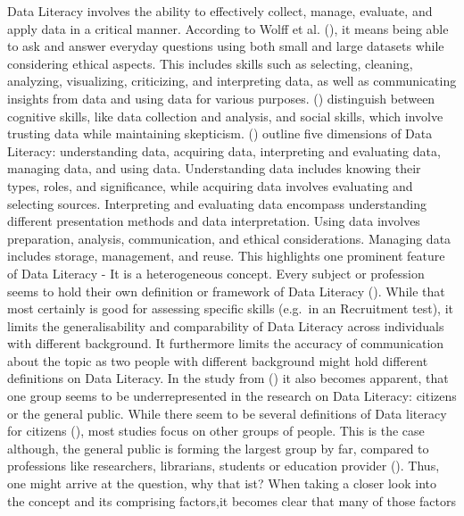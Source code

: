\documentclass[
  12pt,
  a4paper,
  twoside]{article}
\begin{document}
Data Literacy involves the ability to effectively collect, manage,
evaluate, and apply data in a critical manner. According to Wolff et al.
(), it means being able to ask and answer
everyday questions using both small and large datasets while considering
ethical aspects. This includes skills such as selecting, cleaning,
analyzing, visualizing, criticizing, and interpreting data, as well as
communicating insights from data and using data for various purposes.
() distinguish between cognitive
skills, like data collection and analysis, and social skills, which
involve trusting data while maintaining skepticism.
() outline five
dimensions of Data Literacy: understanding data, acquiring data,
interpreting and evaluating data, managing data, and using data.
Understanding data includes knowing their types, roles, and
significance, while acquiring data involves evaluating and selecting
sources. Interpreting and evaluating data encompass understanding
different presentation methods and data interpretation. Using data
involves preparation, analysis, communication, and ethical
considerations. Managing data includes storage, management, and reuse.
This highlights one prominent feature of Data Literacy - It is a
heterogeneous concept. Every subject or profession seems to hold their
own definition or framework of Data Literacy (). While that most certainly is good for assessing specific
skills (e.g.~in an Recruitment test), it limits the generalisability and
comparability of Data Literacy across individuals with different
background. It furthermore limits the accuracy of communication about
the topic as two people with different background might hold different
definitions on Data Literacy. In the study from
() it also becomes apparent,
that one group seems to be underrepresented in the research on Data
Literacy: citizens or the general public. While there seem to be several
definitions of Data literacy for citizens
(), most studies focus on
other groups of people. This is the case although, the general public is
forming the largest group by far, compared to professions like
researchers, librarians, students or education provider
(). Thus, one might arrive at
the question, why that ist? When taking a closer look into the concept
and its comprising factors,it becomes clear that many of those factors
\end{document}
